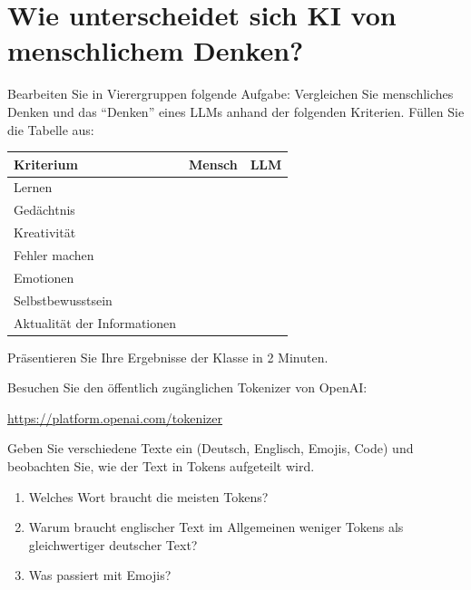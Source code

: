 \section{Wie unterscheidet sich KI von menschlichem Denken?}

\begin{myexercise}[Gruppenvergleich]
Bearbeiten Sie in Vierergruppen folgende Aufgabe: Vergleichen Sie menschliches Denken
und das \enquote{Denken} eines LLMs anhand der folgenden Kriterien.
Füllen Sie die Tabelle aus:

\begin{center}
\begin{tabular}{p{4cm}p{4.5cm}p{4.5cm}}
    \toprule
    \textbf{Kriterium}           & \textbf{Mensch} & \textbf{LLM} \\
    \midrule
    Lernen                       & &                              \\
    Gedächtnis                   & &                              \\
    Kreativität                  & &                              \\
    Fehler machen                & &                              \\
    Emotionen                    & &                              \\
    Selbstbewusstsein            & &                              \\
    Aktualität der Informationen & &                              \\
    \bottomrule
\end{tabular}
\end{center}

Präsentieren Sie Ihre Ergebnisse der Klasse in 2 Minuten.
\end{myexercise}

\begin{mychallenge}
Besuchen Sie den öffentlich zugänglichen Tokenizer von OpenAI:
\begin{center}
    \url{https://platform.openai.com/tokenizer}
\end{center}
Geben Sie verschiedene Texte ein (Deutsch, Englisch, Emojis, Code) und beobachten Sie,
wie der Text in Tokens aufgeteilt wird.

\begin{enumerate}
    \item Welches Wort braucht die meisten Tokens?
    \item Warum braucht englischer Text im Allgemeinen weniger Tokens als
          gleichwertiger deutscher Text?
    \item Was passiert mit Emojis?
\end{enumerate}
\end{mychallenge}
